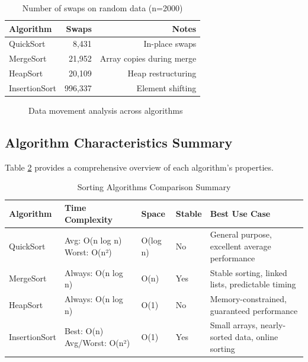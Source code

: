 \documentclass[12pt]{article}
\begin{document}
\begin{table}[H]
\centering
\caption{Number of swaps on random data (n=2000)}
\label{tab:swaps}
\small
\begin{tabular}{@{}lrr@{}}
\toprule
\textbf{Algorithm} & \textbf{Swaps} & \textbf{Notes} \\ 
\midrule
QuickSort       & 8,431   & In-place swaps \\ 
MergeSort       & 21,952  & Array copies during merge \\ 
HeapSort        & 20,109  & Heap restructuring \\ 
InsertionSort   & 996,337 & Element shifting \\ 
\bottomrule
\end{tabular}
\end{table}

\begin{figure}[H]
    \centering
    \caption{Data movement analysis across algorithms}
    \label{fig:swaps_analysis}
\end{figure}

\subsection{Algorithm Characteristics Summary}

Table \ref{tab:algorithm_summary} provides a comprehensive overview of each algorithm's properties.

\begin{table}[H]
\centering
\caption{Sorting Algorithms Comparison Summary}
\label{tab:algorithm_summary}
\footnotesize
\begin{tabular}{@{}p{2.5cm}p{2.5cm}p{1.5cm}p{1.2cm}p{5cm}@{}}
\toprule
\textbf{Algorithm} & \textbf{Time Complexity} & \textbf{Space} & \textbf{Stable} & \textbf{Best Use Case} \\ 
\midrule
QuickSort & Avg: O(n log n) \newline Worst: O(n²) & O(log n) & No & General purpose, excellent average performance \\ 
\midrule
MergeSort & Always: O(n log n) & O(n) & Yes & Stable sorting, linked lists, predictable timing \\ 
\midrule
HeapSort & Always: O(n log n) & O(1) & No & Memory-constrained, guaranteed performance \\ 
\midrule
InsertionSort & Best: O(n) \newline Avg/Worst: O(n²) & O(1) & Yes & Small arrays, nearly-sorted data, online sorting \\ 
\bottomrule
\end{tabular}
\end{table}
\end{document}
